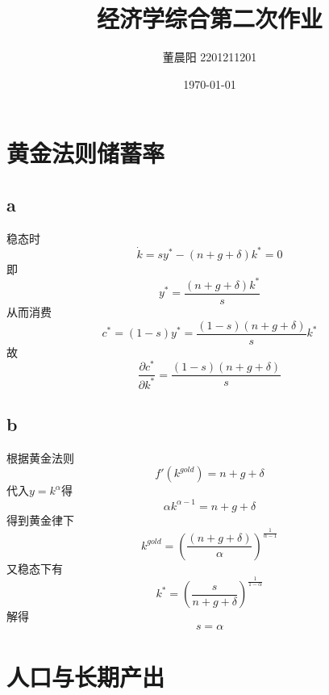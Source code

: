 \documentclass[a4paper,12pt]{ctexart}
\title{经济学综合第二次作业}
\author{董晨阳 2201211201}
\date{\today}
\begin{document}
\maketitle
\section{黄金法则储蓄率}
\subsection*{a}
稳态时
\begin{equation*}
    \dot k=sy^*-(n+g+\delta)k^*=0
\end{equation*}
即
\begin{equation*}
    y^*=\frac{(n+g+\delta)k^*}{s}
\end{equation*}
从而消费
\begin{equation*}
    c^*=(1-s)y^*= \frac{(1-s)(n+g+\delta)}{s}k^*
\end{equation*}
故
\begin{equation*}
    \frac{\partial c^*}{\partial k^*}=\frac{(1-s)(n+g+\delta)}{s}
\end{equation*}
\subsection*{b}
根据黄金法则
\begin{equation*}
    f'(k^{gold})=n+g+\delta
\end{equation*}
代入$y=k^\alpha$得
\begin{equation*}
    \alpha k^{\alpha-1}=n+g+\delta
\end{equation*}
得到黄金律下
\begin{equation*}
    k^{gold}=\left(\frac{(n+g+\delta)}{\alpha}\right)^{\frac{1}{\alpha-1}}
\end{equation*}
又稳态下有
\begin{equation*}
    k^*=\left(\frac{s}{n+g+\delta}\right)^{\frac{1}{1-\alpha}}
\end{equation*}
解得
\begin{equation*}
    s=\alpha
\end{equation*}
\section{人口与长期产出}
\end{document}
